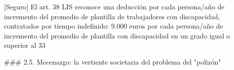 \documentclass[10pt,a4paper]{article}
\begin{document}
[Seguro] El art. 38 LIS reconoce una deducción por cada persona/año de incremento del promedio de plantilla de trabajadores con discapacidad, contratados por tiempo indefinido: 9.000 euros por cada persona/año de incremento del promedio de plantilla con discapacidad en un grado igual o superior al 33%



### 2.5. Mecenazgo: la vertiente societaria del problema del "polizón"
\end{document}
